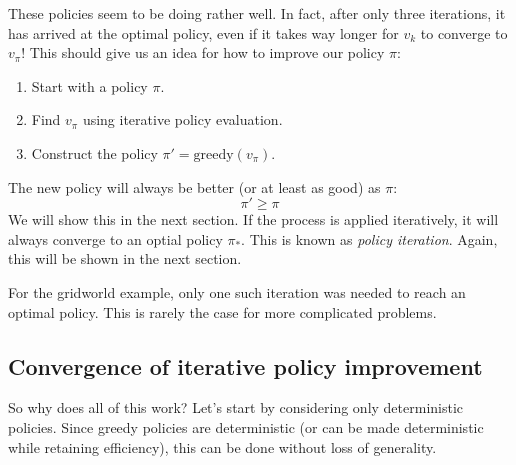 \documentclass[12pt, a4paper]{article}
\numberwithin{equation}{section}
\begin{document}
These policies seem to be doing rather well. In fact, after only three iterations, it has arrived at the optimal policy, even if it takes way longer for $v_k$ to converge to $v_\pi$! This should give us an idea for how to improve our policy $\pi$:
\begin{enumerate}
\item Start with a policy $\pi$.
\item Find $v_\pi$ using iterative policy evaluation.
\item Construct the policy $\pi'=\textrm{greedy}(v_\pi)$.
\end{enumerate}
The new policy will always be better (or at least as good) as $\pi$:
\begin{equation}
\pi'\ge\pi
\end{equation}
We will show this in the next section. If the process is applied iteratively, it will always converge to an optial policy $\pi_*$. This is known as \textit{policy iteration}. Again, this will be shown in the next section.

For the gridworld example, only one such iteration was needed to reach an optimal policy. This is rarely the case for more complicated problems.

\subsection{Convergence of iterative policy improvement}
So why does all of this work? Let's start by considering only deterministic policies. Since greedy policies are deterministic (or can be made deterministic while retaining efficiency), this can be done without loss of generality.
\end{document}
